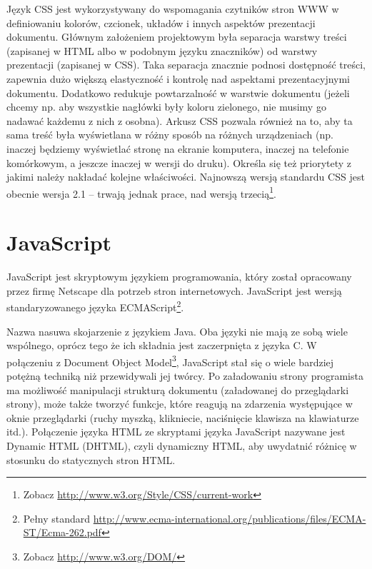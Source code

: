 \documentclass[a4paper,12pt,oneside]{report}
\begin{document}
Język CSS jest wykorzystywany do wspomagania czytników stron WWW w definiowaniu kolorów, czcionek, układów i innych aspektów prezentacji dokumentu. Głównym założeniem projektowym była separacja warstwy treści (zapisanej w HTML albo w podobnym języku znaczników) od warstwy prezentacji (zapisanej w CSS). Taka separacja znacznie podnosi dostępność treści, zapewnia dużo większą elastyczność i kontrolę nad aspektami prezentacyjnymi dokumentu. Dodatkowo redukuje powtarzalność w warstwie dokumentu (jeżeli chcemy np. aby wszystkie nagłówki były koloru zielonego, nie musimy go nadawać każdemu z nich z osobna). Arkusz CSS pozwala również na to, aby ta sama treść była wyświetlana w różny sposób na różnych urządzeniach (np. inaczej będziemy wyświetlać stronę na ekranie komputera, inaczej na telefonie komórkowym, a jeszcze inaczej w wersji do druku). Określa się też priorytety z jakimi należy nakładać kolejne właściwości. Najnowszą wersją standardu CSS jest obecnie wersja 2.1 -- trwają jednak prace, nad wersją trzecią\footnote{Zobacz \url{http://www.w3.org/Style/CSS/current-work}}.

\section{JavaScript}
\label{sec:javascript}
JavaScript jest skryptowym językiem programowania, który został opracowany przez firmę Netscape dla potrzeb stron internetowych. JavaScript jest wersją standaryzowanego języka ECMAScript\footnote{Pełny standard \url{http://www.ecma-international.org/publications/files/ECMA-ST/Ecma-262.pdf}}.

Nazwa nasuwa skojarzenie z językiem Java. Oba języki nie mają ze sobą wiele wspólnego, oprócz tego że ich składnia jest zaczerpnięta z języka C. W połączeniu z Document Object Model\footnote{Zobacz \url{http://www.w3.org/DOM/}}, JavaScript stał się o wiele bardziej potężną techniką niż przewidywali jej twórcy. Po załadowaniu strony programista ma możliwość manipulacji strukturą dokumentu (załadowanej do przeglądarki strony), może także tworzyć funkcje, które reagują na zdarzenia występujące w oknie przeglądarki (ruchy myszką, klikniecie, naciśnięcie klawisza na klawiaturze itd.). Połączenie języka HTML ze skryptami języka JavaScript nazywane jest Dynamic HTML (DHTML), czyli dynamiczny HTML, aby uwydatnić różnicę w stosunku do statycznych stron HTML. 
\end{document}
